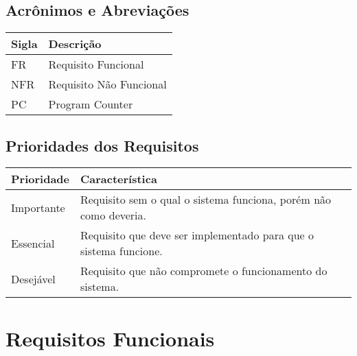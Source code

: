 \documentclass{article}
\begin{document}
	  \subsection{Acrônimos e Abreviações}
	    \FloatBarrier
	    \begin{table}[H]
	      \begin{center}
	        \begin{tabular}[pos]{|m{2cm} | m{12cm}|} 
	          \hline
	          \cellcolor[gray]{0.9}\textbf{Sigla} & \cellcolor[gray]{0.9}\textbf{Descrição} \\ \hline
	          FR      & Requisito Funcional  \\ \hline
	          NFR     & Requisito Não Funcional  \\ \hline
			  PC      & Program Counter \\ \hline 
	        \end{tabular}
	      \end{center}
	    \end{table}  
	
	  \subsection{Prioridades dos Requisitos}
	    \FloatBarrier
	    \begin{table}[H]
	      \begin{center}
	        \begin{tabular}[pos]{|m{2cm} | m{12cm}|} 
	          \hline
	          \cellcolor[gray]{0.9}\textbf{Prioridade} & \cellcolor[gray]{0.9}\textbf{Característica} \\ \hline
	          Importante      & Requisito sem o qual o sistema funciona, porém não como deveria.  \\ \hline
	          Essencial       & Requisito que deve ser implementado para que o sistema funcione.  \\ \hline
	          Desejável       & Requisito que não compromete o funcionamento do sistema.  \\ \hline
	        \end{tabular}
	      \end{center}
	    \end{table}  
	
	\section{Requisitos Funcionais}
	
\end{document}
